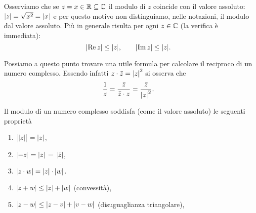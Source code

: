 Osserviamo che se $z = x \in {\mathbb R} \subseteq {\mathbb C}$ il modulo di $z$ coincide
con il valore assoluto: ${\left|z\right|} = \sqrt{x^2} = {\left|x\right|}$ e per questo
motivo non distinguiamo, nelle notazioni, il modulo dal valore assoluto.
Più in generale risulta per ogni $z\in {\mathbb C}$ (la verifica è immediata):
\[
  {\left|\operatorname{Re} z\right|} \le {\left|z\right|}, \qquad
  {\left|\operatorname{Im}z\right|} \le {\left|z\right|}.
\]

Possiamo a questo punto trovare una utile formula per calcolare
il reciproco di un numero complesso. Essendo infatti
$z\cdot \bar z = {\left|z\right|}^2$ si osserva che
\[
  \frac{1}{z}
  = \frac{\bar z}{ \bar z \cdot z}
  = \frac{\bar z}{{\left|z\right|}^2}.
\]

\begin{theorem}
Il modulo di un numero complesso soddisfa (come il valore assoluto)
le seguenti proprietà
\begin{enumerate}
\item $\big\lvert{\left|z\right|}\big\rvert = {\left|z\right|}$,
\item ${\left|-z\right|} = {\left|z\right|}$ = ${\left|\bar z\right|}$,
\item ${\left|z\cdot w\right|} = {\left|z\right|}\cdot{\left|w\right|}$.
\item ${\left|z+w\right|} \le {\left|z\right|}+{\left|w\right|}$ (convessità),
\item ${\left|z-w\right|} \le {\left|z-v\right|} + {\left|v-w\right|}$ (disuguaglianza triangolare),
\end{enumerate}
\end{theorem}
%
